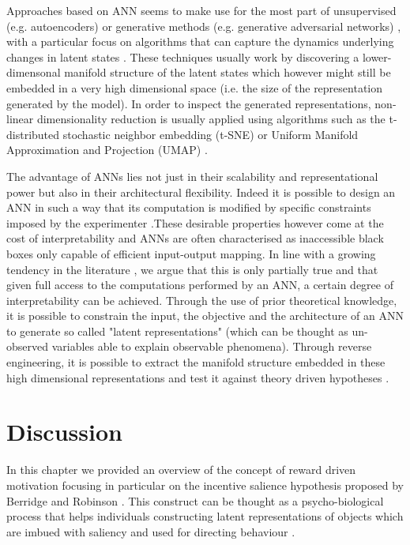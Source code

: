 Approaches based on ANN seems to make use for the most part of unsupervised (e.g. autoencoders) \cite{luxem2020identifying, mccullough2021unsupervised} or generative methods (e.g. generative adversarial networks) \cite{eyjolfsdottir2016learning, mccullough2021unsupervised}, with a particular focus on algorithms that can capture the dynamics underlying changes in latent states \cite{eyjolfsdottir2016learning, song2017reward}. These techniques usually work by discovering a lower-dimensonal manifold structure of the latent states \cite{eyjolfsdottir2016learning} which however might still be embedded in a very high dimensional space (i.e. the size of the representation generated by the model). In order to inspect the generated representations, non-linear dimensionality reduction is usually applied \cite{mccullough2021unsupervised} using algorithms such as the t-distributed stochastic neighbor embedding \cite{van2008visualizing} (t-SNE) or Uniform Manifold Approximation and Projection (UMAP) \cite{mcinnes2018umap-software}. 

The advantage of ANNs lies not just in their scalability and representational power but also in their architectural flexibility. Indeed it is possible to design an ANN in such a way that its computation is modified by specific constraints imposed by the experimenter \cite{eyjolfsdottir2016learning}.These desirable properties however come at the cost of interpretability and ANNs are often characterised as inaccessible black boxes only capable of  efficient input-output mapping. In line with a growing tendency in the literature \cite{barak2017recurrent,kietzmann2018deep, luxem2020identifying, pereira2020quantifying, mccullough2021unsupervised, shi2021learning}, we argue that this is only partially true and that given full access to the computations performed by an ANN, a certain degree of interpretability can be achieved. Through the use of prior theoretical knowledge, it is possible to constrain the input, the objective and the architecture of an ANN to generate so called "latent representations" (which can be thought as un-observed variables able to explain observable phenomena). Through reverse engineering, it is possible to extract the manifold structure embedded in these high dimensional representations and test it against theory driven hypotheses \cite{barak2017recurrent,kietzmann2018deep}. 

\section{Discussion}
\label{discussion_litreview}
In this chapter we provided an overview of the concept of reward driven motivation focusing in particular on the incentive salience hypothesis proposed by Berridge and Robinson \cite{berridge1998role}. This construct can be thought as a psycho-biological process that helps individuals constructing latent representations of objects which are imbued with saliency and used for directing behaviour \cite{berridge2004motivation}. 

